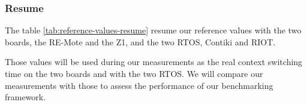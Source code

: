\subsubsection{Resume}
The table \ref{tab:reference-values-resume} resume our reference values with the two boards, the RE-Mote and the Z1, and the two RTOS, Contiki and RIOT.



Those values will be used during our measurements as the real context switching time on the two boards and with the two RTOS.
We will compare our measurements with those to assess the performance of our benchmarking framework.